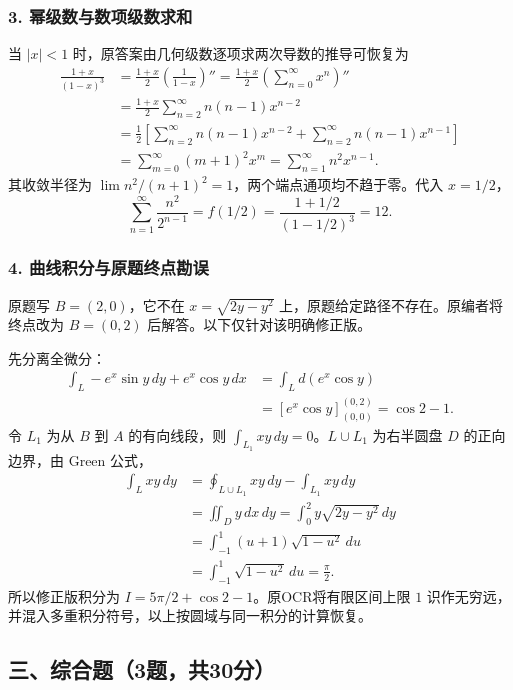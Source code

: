 \documentclass[11pt,fontset=fandol]{ctexart}
\begin{document}
\subsubsection{3.
幂级数与数项级数求和}\label{ux5e42ux7ea7ux6570ux4e0eux6570ux9879ux7ea7ux6570ux6c42ux548c}

当 \(|x|<1\) 时，原答案由几何级数逐项求两次导数的推导可恢复为 \[
\begin{aligned}
\frac{1+x}{(1-x)^3}
&=\frac{1+x}{2}\left(\frac1{1-x}\right)''
=\frac{1+x}{2}\left(\sum_{n=0}^\infty x^n\right)''\\
&=\frac{1+x}{2}\sum_{n=2}^\infty n(n-1)x^{n-2}\\
&=\frac12\left[\sum_{n=2}^\infty n(n-1)x^{n-2}
+\sum_{n=2}^\infty n(n-1)x^{n-1}\right]\\
&=\sum_{m=0}^\infty(m+1)^2x^m
=\sum_{n=1}^\infty n^2x^{n-1}.
\end{aligned}
\] 其收敛半径为 \(\lim n^2/(n+1)^2=1\)，两个端点通项均不趋于零。代入
\(x=1/2\)， \[
\sum_{n=1}^\infty\frac{n^2}{2^{n-1}}=f(1/2)
=\frac{1+1/2}{(1-1/2)^3}=12.
\]

\subsubsection{4.
曲线积分与原题终点勘误}\label{ux66f2ux7ebfux79efux5206ux4e0eux539fux9898ux7ec8ux70b9ux52d8ux8bef}

原题写 \(B=(2,0)\)，它不在 \(x=\sqrt{2y-y^2}\)
上，原题给定路径不存在。原编者将终点改为 \(B=(0,2)\)
后解答。以下仅针对该明确修正版。

先分离全微分： \[
\begin{aligned}
\int_L-e^x\sin y\,dy+e^x\cos y\,dx
&=\int_Ld(e^x\cos y)\\
&=[e^x\cos y]_{(0,0)}^{(0,2)}=\cos2-1.
\end{aligned}
\] 令 \(L_1\) 为从 \(B\) 到 \(A\) 的有向线段，则
\(\int_{L_1}xy\,dy=0\)。\(L\cup L_1\) 为右半圆盘 \(D\) 的正向边界，由
Green 公式， \[
\begin{aligned}
\int_Lxy\,dy
&=\oint_{L\cup L_1}xy\,dy-\int_{L_1}xy\,dy\\
&=\iint_Dy\,dx\,dy
=\int_0^2y\sqrt{2y-y^2}\,dy\\
&=\int_{-1}^1(u+1)\sqrt{1-u^2}\,du\\
&=\int_{-1}^1\sqrt{1-u^2}\,du=\frac\pi2.
\end{aligned}
\] 所以修正版积分为 \(I=5\pi/2+\cos2-1\)。原OCR将有限区间上限 \(1\)
识作无穷远，并混入多重积分符号，以上按圆域与同一积分的计算恢复。

\subsection{三、综合题（3题，共30分）}\label{ux4e09ux7efcux5408ux98983ux9898ux517130ux5206}
\end{document}
